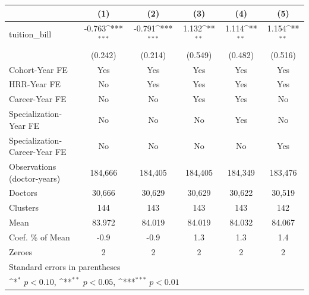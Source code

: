 {
\def\sym#1{\ifmmode^{#1}\else\(^{#1}\)\fi}
\begin{tabular}{l*{5}{c}}
\hline\hline
                    &\multicolumn{1}{c}{(1)}         &\multicolumn{1}{c}{(2)}         &\multicolumn{1}{c}{(3)}         &\multicolumn{1}{c}{(4)}         &\multicolumn{1}{c}{(5)}         \\
\hline
tuition\_bill        &      -0.763\sym{***}&      -0.791\sym{***}&       1.132\sym{**} &       1.114\sym{**} &       1.154\sym{**} \\
                    &     (0.242)         &     (0.214)         &     (0.549)         &     (0.482)         &     (0.516)         \\
[1em]
Cohort-Year FE      &         Yes         &         Yes         &         Yes         &         Yes         &         Yes         \\
[1em]
HRR-Year FE         &          No         &         Yes         &         Yes         &         Yes         &         Yes         \\
[1em]
Career-Year FE      &          No         &          No         &         Yes         &         Yes         &          No         \\
[1em]
Specialization-Year FE&          No         &          No         &          No         &         Yes         &          No         \\
[1em]
Specialization-Career-Year FE&          No         &          No         &          No         &          No         &         Yes         \\
\hline
Observations (doctor-years)&     184,666         &     184,405         &     184,405         &     184,349         &     183,476         \\
Doctors             &      30,666         &      30,629         &      30,629         &      30,622         &      30,519         \\
Clusters            &         144         &         143         &         143         &         143         &         142         \\
Mean                &      83.972         &      84.019         &      84.019         &      84.032         &      84.067         \\
Coef. \% of Mean    &        -0.9         &        -0.9         &         1.3         &         1.3         &         1.4         \\
Zeroes              &           2         &           2         &           2         &           2         &           2         \\
\hline\hline
\multicolumn{6}{l}{\footnotesize Standard errors in parentheses}\\
\multicolumn{6}{l}{\footnotesize \sym{*} \(p<0.10\), \sym{**} \(p<0.05\), \sym{***} \(p<0.01\)}\\
\end{tabular}
}
